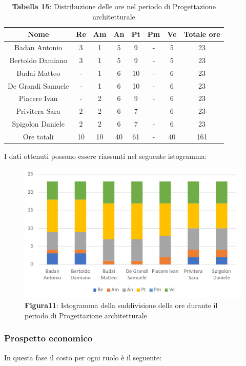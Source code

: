 \begin{table}[H]
	\centering
	\renewcommand{\arraystretch}{1.5}
	\begin{tabular}{|c|c|c|c|c|c|c|c|}
		\hline
		\rowcolor{lighter-grayer}
		Nome & Re & Am & An & Pt & Pm & Ve & Totale ore\\
		\hline
		Badan Antonio & 3 & 1 & 5 &  9 & - & 5 & 23 \\
		\hline
		Bertoldo Damiano & 3 & 1 & 5 & 9 & - & 5 & 23 \\
		\hline
		Budai Matteo & - & 1 & 6 & 10 & - & 6 & 23 \\
		\hline
		De Grandi Samuele & - & 1 & 6 & 10 & - & 6 & 23 \\
		\hline
		Piacere Ivan & - & 2 & 6 & 9 & - & 6 & 23 \\
		\hline
		Privitera Sara & 2 & 2 & 6 & 7 & - & 6 & 23 \\
		\hline
		Spigolon Daniele & 2 & 2 & 6 & 7 & - & 6 & 23 \\
		\hline
		Ore totali & 10 & 10 & 40 & 61 & - & 40 & 161 \\
		\hline
	\end{tabular}
	\caption*{\textbf{Tabella 15}: Distribuzione delle ore nel periodo di Progettazione architetturale\\}
\end{table}	
I dati ottenuti possono essere riassunti nel seguente istogramma:

\begin{figure}[H]
	\centering
	\includegraphics[width=0.7\linewidth]{res/images/IstogrammaFase2.png}
	\caption*{\textbf{Figura11}: Istogramma della suddivisione delle ore durante il periodo di Progettazione architetturale}
	\label{fig:Figura10}
\end{figure}


\subsubsection{Prospetto economico}
In questa fase il costo per ogni ruolo è il seguente:

